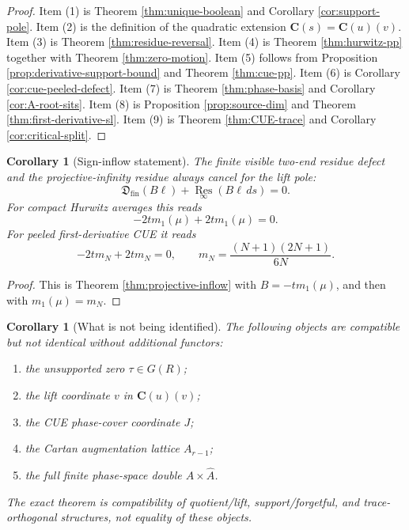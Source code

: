 \documentclass[11pt]{article}
\newcommand{\C}{\mathbf C}
\newcommand{\Res}{\operatorname*{Res}}
\theoremstyle{plain}
\newtheorem{corollary}[theorem]{Corollary}
\theoremstyle{definition}
\begin{document}
\begin{proof}
Item (1) is Theorem \ref{thm:unique-boolean} and Corollary \ref{cor:support-pole}.  Item (2) is the definition of the quadratic extension \(\C(s)=\C(u)(v)\).  Item (3) is Theorem \ref{thm:residue-reversal}.  Item (4) is Theorem \ref{thm:hurwitz-pp} together with Theorem \ref{thm:zero-motion}.  Item (5) follows from Proposition \ref{prop:derivative-support-bound} and Theorem \ref{thm:cue-pp}.  Item (6) is Corollary \ref{cor:cue-peeled-defect}.  Item (7) is Theorem \ref{thm:phase-basis} and Corollary \ref{cor:A-root-sits}.  Item (8) is Proposition \ref{prop:source-dim} and Theorem \ref{thm:first-derivative-sl}.  Item (9) is Theorem \ref{thm:CUE-trace} and Corollary \ref{cor:critical-split}.
\end{proof}

\begin{corollary}[Sign-inflow statement]\label{cor:sign-inflow}
The finite visible two-end residue defect and the projective-infinity residue always cancel for the lift pole:
\[
   \mathfrak D_{\operatorname{fin}}(B\ell)+\Res_{\infty}(B\ell\,ds)=0.
\]
For compact Hurwitz averages this reads
\[
   -2tm_1(\mu)+2tm_1(\mu)=0.
\]
For peeled first-derivative CUE it reads
\[
   -2tm_N+2tm_N=0,
   \qquad
   m_N=\frac{(N+1)(2N+1)}{6N}.
\]
\end{corollary}

\begin{proof}
This is Theorem \ref{thm:projective-inflow} with \(B=-tm_1(\mu)\), and then with \(m_1(\mu)=m_N\).
\end{proof}

\begin{corollary}[What is not being identified]\label{cor:non-identifications}
The following objects are compatible but not identical without additional functors:
\begin{enumerate}[label=\textup{(\arabic*)}]
\item the unsupported zero \(\tau\in G(R)\);
\item the lift coordinate \(v\) in \(\C(u)(v)\);
\item the CUE phase-cover coordinate \(J\);
\item the Cartan augmentation lattice \(A_{r-1}\);
\item the full finite phase-space double \(A\times\widehat A\).
\end{enumerate}
The exact theorem is compatibility of quotient/lift, support/forgetful, and trace-orthogonal structures, not equality of these objects.
\end{corollary}
\end{document}
